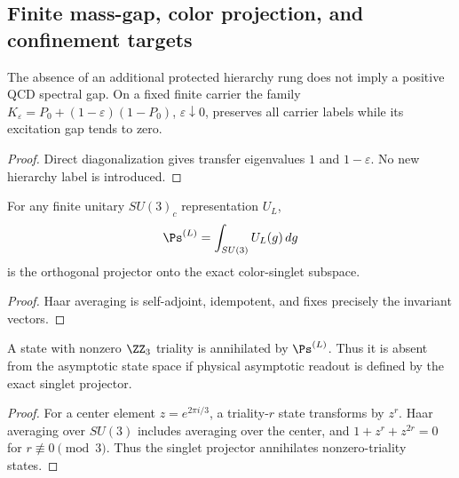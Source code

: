 \documentclass[12pt,a4paper]{article}
\begin{document}
\subsection{Finite mass-gap, color projection, and confinement targets}
\label{p10:sec:finite-mass-gap-floor}

\begin{theorem}
\label{p10:thm:desert-shell-infrared-cascade-block}
The absence of an additional protected hierarchy rung does not imply a positive QCD spectral gap.  On a fixed finite carrier the family \(K_\varepsilon=P_0+(1-\varepsilon)(1-P_0)\), \(\varepsilon\downarrow0\), preserves all carrier labels while its excitation gap tends to zero.
\end{theorem}
\begin{proof}Direct diagonalization gives transfer eigenvalues \(1\) and \(1-\varepsilon\).  No new hierarchy label is introduced.\end{proof}

\begin{theorem}
\label{p10:thm:exact-finite-singlet-projector}
For any finite unitary \(SU(3)_c\) representation \(U_L\),
\begin{equation}
\Ps^{(L)}=\int_{SU(3)}U_L(g)\,dg
\end{equation}
is the orthogonal projector onto the exact color-singlet subspace.
\end{theorem}
\begin{proof}Haar averaging is self-adjoint, idempotent, and fixes precisely the invariant vectors.\end{proof}

\begin{corollary}
\label{p10:cor:nonzero-triality-no-asymptotic-ray}
A state with nonzero \(\ZZ_3\) triality is annihilated by \(\Ps^{(L)}\).  Thus it is absent from the asymptotic state space if physical asymptotic readout is defined by the exact singlet projector.
\end{corollary}
\begin{proof}
For a center element $z=e^{2\pi i/3}$, a triality-$r$ state transforms by $z^r$.  Haar averaging over $SU(3)$ includes averaging over the center, and $1+z^r+z^{2r}=0$ for $r\not\equiv0\pmod3$.  Thus the singlet projector annihilates nonzero-triality states.
\end{proof}
\end{document}
